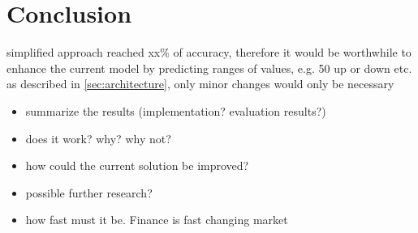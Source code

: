 \section{Conclusion}
\label{sec:ausblick}
simplified approach reached xx\% of accuracy, therefore it would be worthwhile to enhance the current model by predicting ranges of values, e.g. 50 up or down etc.
as described in \ref{sec:architecture}, only minor changes would only be necessary
\begin{itemize}
	\item summarize the results (implementation? evaluation results?) 
	\item does it work? why? why not? 
	\item how could the current solution be improved? 
	\item possible further research? 
	\item how fast must it be. Finance is fast changing market
\end{itemize}